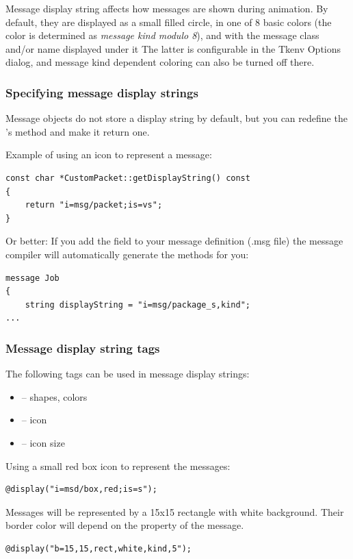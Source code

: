 Message display string affects how messages are shown during animation.
By default, they are displayed as a small filled circle, in one of
8 basic colors (the color is determined as \textit{message kind modulo 8}),
and with the message class and/or name displayed under it
The latter is configurable in the Tkenv Options dialog, and message kind
dependent coloring can also be turned off there.

\subsubsection{Specifying message display strings}
Message objects do not store a display string by default, but you can redefine
the 's  method and make it return
one.

Example of using an icon to represent a message:
\begin{verbatim}
const char *CustomPacket::getDisplayString() const
{
    return "i=msg/packet;is=vs";
}
\end{verbatim}

Or better: If you add the field  to your message
definition (.msg file) the message compiler will automatically generate
the  methods for you:

\begin{verbatim}
message Job
{
    string displayString = "i=msg/package_s,kind";
...
\end{verbatim}

\subsubsection{Message display string tags}

The following tags can be used in message display strings:
\begin{itemize}
  \item{ -- shapes, colors}
  \item{ -- icon}
  \item{ -- icon size}
\end{itemize}

Using a small red box icon to represent the messages:
\begin{verbatim}
@display("i=msd/box,red;is=s");
\end{verbatim}

Messages will be represented by a 15x15 rectangle with white background.
Their border color will depend on the  property of the message.
\begin{verbatim}
@display("b=15,15,rect,white,kind,5");
\end{verbatim}

